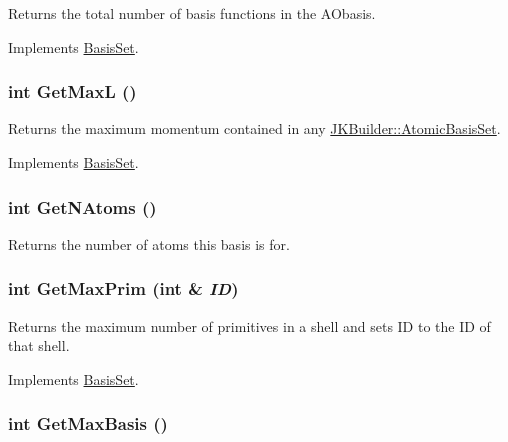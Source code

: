Returns the total number of basis functions in the AObasis. 

Implements \hyperlink{classJKBuilder_1_1BasisSet_a1167cdb6f1e1ba08ba6cbffa0b32ca77}{BasisSet}.\hypertarget{classJKBuilder_1_1AOBasisSet_af6694a93cc5d86a8f3cd1aa984a0cdc3}{
\subsubsection[{GetMaxL}]{\setlength{\rightskip}{0pt plus 5cm}int GetMaxL ()}}
\label{classJKBuilder_1_1AOBasisSet_af6694a93cc5d86a8f3cd1aa984a0cdc3}


Returns the maximum momentum contained in any \hyperlink{classJKBuilder_1_1AtomicBasisSet}{JKBuilder::AtomicBasisSet}. 

Implements \hyperlink{classJKBuilder_1_1BasisSet_a5580c8eff6cb4242a298c15da2292fa4}{BasisSet}.\hypertarget{classJKBuilder_1_1AOBasisSet_a6a6c8b94fb293123b918605d0507ebbf}{
\subsubsection[{GetNAtoms}]{\setlength{\rightskip}{0pt plus 5cm}int GetNAtoms ()}}
\label{classJKBuilder_1_1AOBasisSet_a6a6c8b94fb293123b918605d0507ebbf}


Returns the number of atoms this basis is for. \hypertarget{classJKBuilder_1_1AOBasisSet_a03191bf41d6e3a2445dd3eb8640305be}{
\subsubsection[{GetMaxPrim}]{\setlength{\rightskip}{0pt plus 5cm}int GetMaxPrim (int \& {\em ID})}}
\label{classJKBuilder_1_1AOBasisSet_a03191bf41d6e3a2445dd3eb8640305be}


Returns the maximum number of primitives in a shell and sets ID to the ID of that shell. 

Implements \hyperlink{classJKBuilder_1_1BasisSet_a4e5f8295f4fe1ecf1a910ae2fcb46c1f}{BasisSet}.\hypertarget{classJKBuilder_1_1AOBasisSet_adcda37af511d6b4f8d305fcba2da5c4a}{
\subsubsection[{GetMaxBasis}]{\setlength{\rightskip}{0pt plus 5cm}int GetMaxBasis ()}}
\label{classJKBuilder_1_1AOBasisSet_adcda37af511d6b4f8d305fcba2da5c4a}


